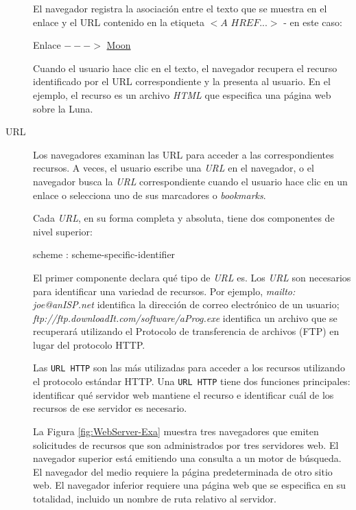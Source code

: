 \begin{description}
	El navegador registra la asociación entre el texto que se muestra en el enlace y el URL contenido en la etiqueta {$<A$ $HREF...>$} - en este caso:
	
	\begin{kaobox}[frametitle= Enlace  URL]
		Enlace $--->$ \href{http://www.cdk5.net/WebExample/moon.html}{Moon}	
	\end{kaobox}
	
	Cuando el usuario hace clic en el texto, el navegador recupera el recurso identificado por el URL correspondiente y la presenta al usuario. En el ejemplo, el recurso es un archivo \textit{HTML}  que especifica una página web sobre la Luna.
	
	\item[{URL}]  Los navegadores examinan las \gls{URL}	  para acceder a las correspondientes recursos. A veces, el usuario escribe una \textit{URL} en el navegador, o el  navegador busca la \textit{URL} correspondiente cuando el usuario hace clic en un enlace o selecciona uno de sus marcadores o \textit{bookmarks}.
	
	
	
	Cada \textit{URL}, en su forma completa y absoluta, tiene dos componentes de nivel superior:
	
	
	
	\begin{kaobox}[frametitle=Componentes URL]
		scheme : scheme-specific-identifier
	\end{kaobox}
	
	El primer componente declara qué tipo de \textit{URL} es. Los \textit{URL} son necesarios para identificar una variedad de recursos. Por ejemplo, \textit{mailto: joe@anISP.net}	identifica la dirección de correo electrónico de un usuario; \textit{ftp://ftp.downloadIt.com/software/aProg.exe} identifica
	un archivo que se recuperará utilizando el Protocolo de transferencia de archivos (FTP) en lugar del	protocolo HTTP.  
	
	Las \texttt{URL HTTP} son las más utilizadas para acceder a los recursos utilizando el protocolo estándar HTTP. 
	Una \texttt{URL HTTP} tiene dos funciones principales: identificar qué servidor web mantiene el recurso e identificar cuál de los recursos de ese servidor es necesario.
	
	La Figura \ref{fig:WebServer-Exa} muestra tres navegadores que emiten solicitudes de recursos que son administrados por tres servidores web. El navegador superior está emitiendo una consulta a un motor de búsqueda. El navegador del medio requiere la página predeterminada de otro sitio web. El navegador inferior requiere una p\'agina web  que se especifica en su totalidad, incluido un nombre de ruta relativo al servidor.  
	

\end{description}
